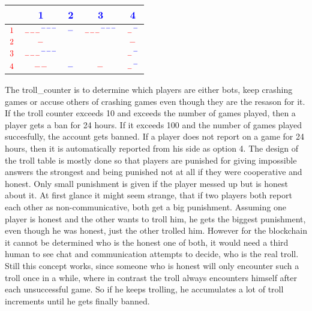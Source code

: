 \documentclass{article}
\begin{document}
\begin{center}
	\begin{tabular}{ c | c | c | c | c }
		& \textcolor{blue}{1} & \textcolor{blue}{2} & \textcolor{blue}{3} & \textcolor{blue}{4} \\ \hline
		$\textcolor{red}{1}$ & $\textcolor{red}{{}_{---}} \textcolor{blue}{{}^{---}} $ & $\textcolor{blue}{-} $ & $\textcolor{red}{{}_{---}} \textcolor{blue}{{}^{---}}$ & $\textcolor{red}{{}_-} \textcolor{blue}{{}^-}$ \\ \hline
		$\textcolor{red}{2}$ & $\textcolor{red}{-}$ &  &  & $\textcolor{red}{-}$ \\ \hline
		$\textcolor{red}{3}$ & $\textcolor{red}{{}_{---}} \textcolor{blue}{{}^{---}}$ &  &  & $\textcolor{red}{{}_-} \textcolor{blue}{{}^-}$ \\ \hline
		$\textcolor{red}{4}$ &  $\textcolor{red}{{--}}$  &  $\textcolor{blue}{-}$  & $\textcolor{red}{{-}}$ & $\textcolor{red}{{}_-} \textcolor{blue}{{}^-}$ \\ 
	\end{tabular}
\end{center}
%
The troll\_counter is to determine which players are either bots, keep crashing games or accuse others of crashing games even though they are the resason for it. If the troll counter exceeds 10 and exceeds the number of games played, then a player gets a ban for 24 hours. If it exceeds 100 and the number of games played succesfully, the account gets banned. If a player does not report on a game for 24 hours, then it is automatically reported from his side as option 4. The design of the troll table is mostly done so that players are punished for giving impossible answers the strongest and being punished not at all if they were cooperative and honest. Only small punishment is given if the player messed up but is honest about it. At first glance it might seem strange, that if two players both report each other as non-communicative, both get a big punishment. Assuming one player is honest and the other wants to troll him, he gets the biggest punishment, even though he was honest, just the other trolled him. However for the blockchain it cannot be determined who is the honest one of both, it would need a third human to see chat and communication attempts to decide, who is the real troll. Still this concept works, since someone who is honest will only encounter such a troll once in a while, where in contrast  the troll always encounters himself after each unsuccessful game. So if he keeps trolling, he accumulates a lot of troll increments until he gets finally banned.
\end{document}
